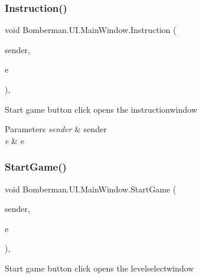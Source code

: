 \mbox{\label{class_bomberman_1_1_u_i_1_1_main_window_a4bce805a05bd09f806ee58df8ff17ac8}} 
\subsubsection{\texorpdfstring{Instruction()}{Instruction()}}
{\footnotesize\ttfamily void Bomberman.\+U\+I.\+Main\+Window.\+Instruction (\begin{DoxyParamCaption}\item[{object}]{sender,  }\item[{Routed\+Event\+Args}]{e }\end{DoxyParamCaption})\hspace{0.3cm}{\ttfamily [inline]}, {\ttfamily [private]}}



Start game button click opens the instructionwindow 


\begin{DoxyParams}{Parameters}
{\em sender} & sender\\
\hline
{\em e} & e\\
\hline
\end{DoxyParams}
\mbox{\label{class_bomberman_1_1_u_i_1_1_main_window_abc549365947e1eb5b45eb21d059b585b}} 
\subsubsection{\texorpdfstring{StartGame()}{StartGame()}}
{\footnotesize\ttfamily void Bomberman.\+U\+I.\+Main\+Window.\+Start\+Game (\begin{DoxyParamCaption}\item[{object}]{sender,  }\item[{Routed\+Event\+Args}]{e }\end{DoxyParamCaption})\hspace{0.3cm}{\ttfamily [inline]}, {\ttfamily [private]}}



Start game button click opens the levelselectwindow 


